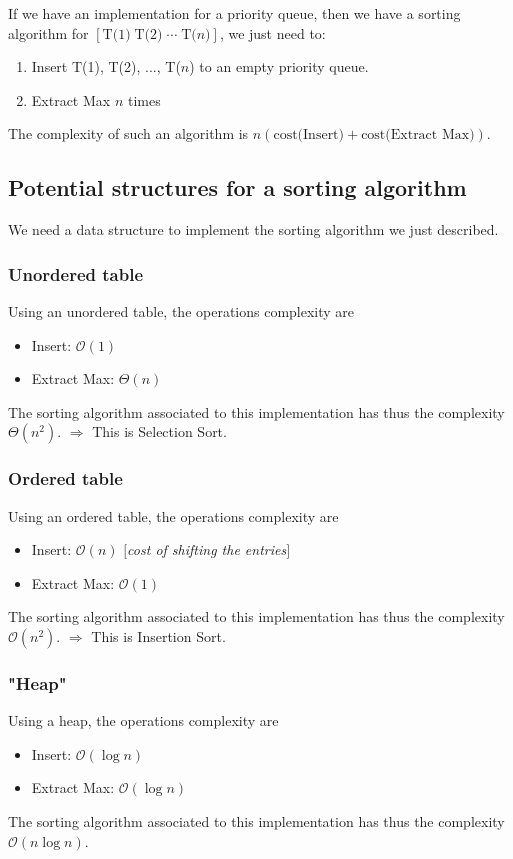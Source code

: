 If we have an implementation for a priority queue, then we have a sorting algorithm for $\left[ \text{T(1)} \; \text{T(2)} \; \cdots \; \text{T(}n\text{)} \right]$, we just need to:
\begin{enumerate} 
\item Insert T(1), T(2), ..., T($n$) to an empty priority queue.
\item Extract Max $n$ times
\end{enumerate}
The complexity of such an algorithm is $n \left( \text{cost(Insert)} + \text{cost(Extract Max)} \right)$.

\subsection{Potential structures for a sorting algorithm}

We need a data structure to implement the sorting algorithm we just described. 

\subsubsection{Unordered table} 
Using an unordered table, the operations complexity are \begin{itemize}
\item Insert: $\mathcal{O}(1)$
\item Extract Max: $\Theta (n)$
\end{itemize}
The sorting algorithm associated to this implementation has thus the complexity $\Theta (n^2)$. \newline
$\Rightarrow$ This is Selection Sort.

\subsubsection{Ordered table} 
Using an ordered table, the operations complexity are \begin{itemize}
\item Insert: $\mathcal{O}(n)$ \textit{$[$cost of shifting the entries$]$}
\item Extract Max: $\mathcal{O}(1)$
\end{itemize}
The sorting algorithm associated to this implementation has thus the complexity $\mathcal{O} (n^2)$. \newline
$\Rightarrow$ This is Insertion Sort.

\subsubsection{"Heap"} Using a heap, the operations complexity are \begin{itemize}
\item Insert: $\mathcal{O}(\log n)$
\item Extract Max: $\mathcal{O}(\log n)$
\end{itemize}
The sorting algorithm associated to this implementation has thus the complexity $\mathcal{O} (n \log n)$.

